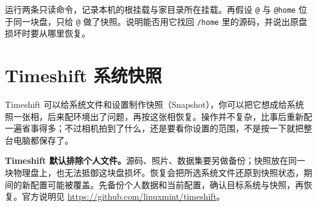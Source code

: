 \begin{exercise}\label{ex:appendix-btrfs}
运行两条只读命令，记录本机的根挂载与家目录所在挂载。再假设 \texttt{@} 与 \texttt{@home} 位于同一块盘，只给 \texttt{@} 做了快照。说明能否用它找回 \texttt{/home} 里的源码，并说出原盘损坏时要从哪里恢复。
\end{exercise}

\section{Timeshift 系统快照}
\label{sec:timeshift-backup}
Timeshift 可以给系统文件和设置制作快照（Snapshot），你可以把它想成给系统照一张相，后来配环境出了问题，再按这张相恢复。操作并不复杂，比事后重新配一遍省事得多；不过相机拍到了什么，还是要看你设置的范围，不是按一下就把整台电脑都保存了。
\begin{note}
\textbf{Timeshift 默认排除个人文件。}源码、照片、数据集要另做备份；快照放在同一块物理盘上，也无法抵御这块盘损坏。恢复会把所选系统文件还原到快照状态，期间的新配置可能被覆盖。先备份个人数据和当前配置，确认目标系统与快照，再恢复。官方说明见 \url{https://github.com/linuxmint/timeshift}。
\end{note}
